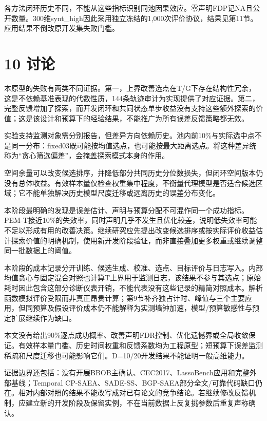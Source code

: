 \documentclass[11pt,a4paper]{article}
\begin{document}
各方法闭环历史不同，不能从这些指标识别同池因果效应。零声明FDP记NA且公开数量。300维synt\_high因此采用独立冻结的1,000次评价协议，结果见第11节。应用结果不倒改原开发集失败门槛。

\hypertarget{ux8ba8ux8bba}{%
\section{10 讨论}\label{ux8ba8ux8bba}}

本原型的失败有两类不同证据。第一，上界改善选点在T/G下存在结构性冗余，这是不依赖基准表现的代数性质，144条轨迹审计为实现提供了对应证据。第二，完整反馈增加了探索，而开发闭环和共同状态单步收益没有支持这些额外探索的价值；这是该设计和预算下的经验结果，不能推广为所有误差反馈策略都无效。

实验支持监测对象需分别报告，但差异方向依赖历史。池内前10\%与实际选中点不是同一分布：fixed03既可能按均值选点，也可能按最大距离选点。将这种差异统称为``贪心筛选偏差''，会掩盖探索模式本身的作用。

空间余量可以改变候选排序，并降低部分共同历史分位数损失，但闭环空间版本仍没有总体收益。有效样本量仅检查权重集中程度，不衡量代理模型是否适合候选区域；它不能单独解决历史模型尺度迁移或远离历史的误差分布变化。

本阶段最明确的发现是误差估计、声明与预算分配不可混作同一个成功指标。PEM-T接近10\%的失效率，同时声明几乎不发生且优化较差，说明低失效率可能不足以形成有用的改善决策。继续研究应先提出改变候选排序或按实际评价收益估计探索价值的明确机制，使用新开发阶段验证，而非直接叠加更多权重或继续调整同一批数据上的阈值。

本阶段的成本记录分开训练、候选生成、校准、选点、目标评价与日志写入。内部均值贪心与固定混合对照也计算T上界用于监测日志，该结果不参与其选点；原始耗时因此包含这部分诊断仪表开销，不能代表没有这些记录的精简对照成本。解析函数模拟评价受限而非真正昂贵计算；第9节补齐独占计时、峰值与三个主要应用，但同预算及假设评价成本仍不能解释为实测墙钟加速，模型/预算敏感性与预定扩展继续作为缺口。

本文没有给出90\%逐点成功概率、改善声明FDR控制、优化遗憾界或全局收敛保证。有效样本量门槛、历史时间权重和反馈系数均为工程原型；短预算下误差监测稀疏和尺度迁移也可能影响它们。D=10/20开发结果不能证明一般高维能力。

证据边界还包括：没有开展BBOB主确认、CEC2017、LassoBench应用和完整外部基线；Temporal
CP-SAEA、SADE-SS、BGP-SAEA部分全文/可靠代码缺口仍在。相对内部对照的结果不能改写成对已有论文的竞争结论。若继续修改反馈机制，应建立新的开发阶段及保留实例，不在当前数据上反复挑参数后重复声称确认。
\end{document}
